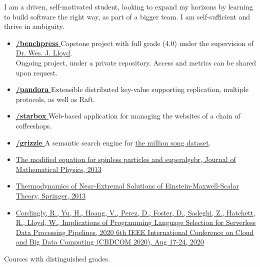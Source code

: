 

\begin{flushleft}
\justifying
I am a driven, self-motivated student, looking to expand my horizons by learning to build
software the right way, as part of a bigger team. I am self-sufficient and thrive in ambiguity.

\end{flushleft}


\small
{}


\begin{itemize}
    \item \justifying \href{https://github.com/zsadeghi/benchpress}{\githubsymbol \textbf{/benchpress} \externalLink} Capstone project with full grade
    (4.0) under the supervision of \href{http://faculty.washington.edu/wlloyd/}{Dr. Wes. J. Lloyd}. \\
    \faEye{} Ongoing project, under a private repository. Access and metrics can be shared upon request.
    \item \justifying \href{https://github.com/zsadeghi/pandora}{\githubsymbol \textbf{/pandora} \externalLink} Extensible distributed key-value supporting replication, multiple protocols, as well as Raft. 
    \item \justifying \href{https://github.com/zsadeghi/starbox}{\githubsymbol \textbf{/starbox} \externalLink} Web-based application for managing the websites of a chain of coffeeshops.
    \item \justifying \href{https://github.com/zsadeghi/grizzle}{\githubsymbol \textbf{/grizzle} \externalLink} A semantic search engine for \href{http://millionsongdataset.com/}{the million song dataset}.
\end{itemize}


\begin{itemize}
    \item \href{https://dx.doi.org/10.1063/1.4823715}{The modified equation for spinless particles and superalgebr, Journal of Mathematical Physics, 2013 \externalLink}
    \item \href{https://link.springer.com/article/10.1007/s10773-013-1542-2#page-1}{Thermodynamics of Near-Extremal Solutions of Einstein-Maxwell-Scalar Theory, Springer, 2013 \externalLink}
    \item \href{http://faculty.washington.edu/wlloyd/papers/cbdcom_FaaSProgrammingLanguagePaper_camera_ready.pdf}{Cordingly, R., Yu, H., Hoang, V., Perez, D., Foster, D., Sadeghi, Z., Hatchett, R., Lloyd, W., Implications of Programming Language Selection for Serverless Data Processing Pipelines, 2020 6th IEEE International Conference on Cloud and Big Data Computing (CBDCOM 2020), Aug 17-24, 2020}
\end{itemize}


Courses with distinguished grades.

\small
{}


